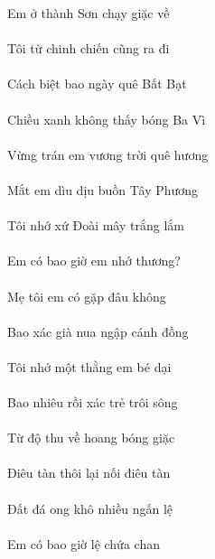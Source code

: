 \documentclass[14pt,a4paper]{extarticle}
\begin{document}
Em ở thành Sơn chạy giặc về\\[1ex]
{\Huge \em \ở     }\\[1ex]
Tôi từ chinh chiến cũng ra đi\\[1ex]
{\Huge {}  \chinh {}  \ra {}}\\[1ex]
Cách biệt bao ngày quê Bất Bạt\\[1ex]
{\Huge {}  \bao {}   }\\[1ex]
Chiều xanh không thấy bóng Ba Vì\\[1ex]
{\Huge {} \xanh {}   \ba {}}\\[1ex]
Vừng trán em vương trời quê hương\\[1ex]
{\Huge {}  \em {}   }\\[1ex]
Mắt em dìu dịu buồn Tây Phương\\[1ex]
{\Huge {} \em {}    }\\[1ex]
Tôi nhớ xứ Đoài mây trắng lắm\\[1ex]
{\Huge {}      }\\[1ex]
Em có bao giờ em nhớ thương?\\[1ex]
{\Huge \em {} \bao {} \em {} }\\[1ex]
Mẹ tôi em có gặp đâu không\\[1ex]
{\Huge {}  \em {}   }\\[1ex]
Bao xác già nua ngập cánh đồng\\[1ex]
{\Huge \bao {}  \nua {} }\\[1ex]
Tôi nhớ một thằng em bé dại\\[1ex]
{\Huge {}    \em {} }\\[1ex]
Bao nhiêu rồi xác trẻ trôi sông\\[1ex]
{\Huge \bao {}     }\\[1ex]
Từ độ thu về hoang bóng giặc\\[1ex]
{\Huge {}  \thu {} \hoang {} }\\[1ex]
Điêu tàn thôi lại nối điêu tàn\\[1ex]
{\Huge {}      }\\[1ex]
Đất đá ong khô nhiều ngấn lệ\\[1ex]
{\Huge {}  \ong {}   }\\[1ex]
Em có bao giờ lệ chứa chan\\[1ex]
\end{document}
